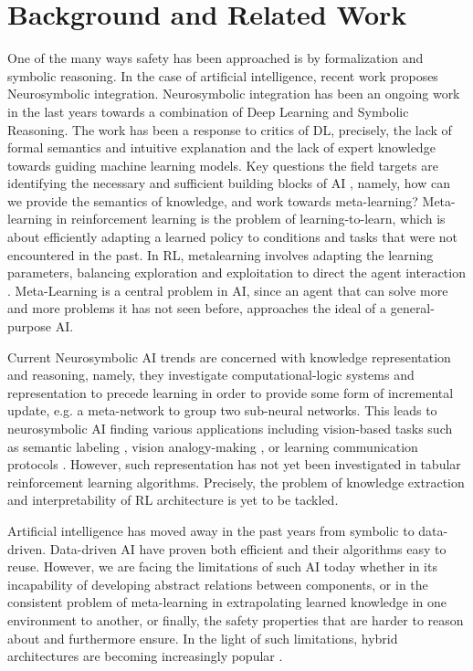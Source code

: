 \documentclass[a4paper,11pt]{article}
\begin{document}
\section{Background and Related Work}
One of the many ways safety has been approached is by formalization and symbolic reasoning. 
In the case of artificial intelligence, recent work proposes Neurosymbolic integration. 
Neurosymbolic integration has been an ongoing work in the last years towards a combination of Deep Learning and Symbolic Reasoning.
The work has been a response to critics of DL, precisely, the lack of formal semantics and intuitive explanation and the lack of expert knowledge towards guiding machine learning models. 
Key questions the field targets are identifying the necessary and sufficient building blocks of AI \cite{garcez2020neurosymbolic}, namely, how can we provide the semantics of knowledge, 
and work towards meta-learning? Meta-learning in reinforcement learning is the problem of learning-to-learn, which is about efficiently
adapting a learned policy to conditions and tasks that were not encountered in the past. In RL, metalearning
involves adapting the learning parameters, balancing exploration and exploitation to direct the
agent interaction \cite{gupta_meta-reinforcement_2018,schweighofer_meta-learning_2003}. Meta-Learning is a central problem in AI, since an agent that can solve more
and more problems it has not seen before, approaches the ideal of a general-purpose AI. 

\medskip

Current Neurosymbolic AI trends are concerned with knowledge representation and reasoning, namely, they investigate computational-logic systems 
and representation to precede learning in order to provide some form of incremental update, e.g. a meta-network to group two sub-neural networks. \cite{Besold2017NeuralSymbolicLA}
This leads to neurosymbolic AI finding various applications including vision-based tasks such as semantic labeling \cite{vinyals2015, karpathy2015}, 
vision analogy-making \cite{Reed2015DeepVA}, or learning communication protocols \cite{Foerster2016LearningTC}.
However, such representation has not yet been investigated in tabular reinforcement learning algorithms. Precisely, the problem of knowledge extraction and interpretability of RL architecture is yet to be tackled.

\medskip

Artificial intelligence has moved away in the past years from symbolic to data-driven. 
Data-driven AI have proven both efficient and their algorithms easy to reuse. However, 
we are facing the limitations of such AI today whether 
in its incapability of developing abstract relations between components, or in the consistent problem of meta-learning in extrapolating learned knowledge 
in one environment to another, or finally, the safety properties that are harder to reason about and furthermore ensure. 
In the light of such limitations, hybrid architectures are becoming increasingly popular \cite{garcez2020neurosymbolic}. 
\end{document}

